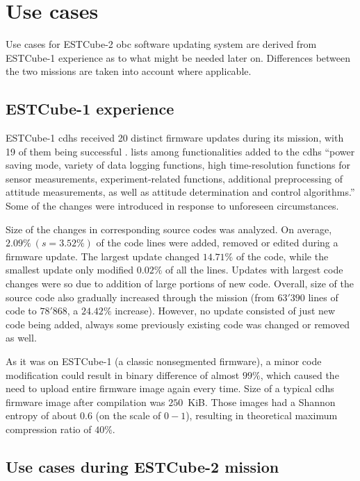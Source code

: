 \newpage
\section{Use cases}
\label{s:usecases}

Use cases for ESTCube-2 \gls{obc} software updating system are derived from ESTCube-1 experience as to what might be needed later on. Differences between the two missions are taken into account where applicable.

\subsection{ESTCube-1 experience}

ESTCube-1 \gls{cdhs} received 20 distinct firmware updates during its mission, with 19 of them being successful \cite{Suenter2016}. \textcite{Slavinskis2015} lists among functionalities added to the \gls{cdhs} ``power saving mode, variety of data logging functions, high time-resolution functions for sensor measurements, experiment-related functions, additional preprocessing of attitude measurements, as well as attitude determination and control algorithms.'' Some of the changes were introduced in response to unforeseen circumstances.

Size of the changes in corresponding source codes was analyzed. On average, $2.09\%\ (s=3.52\%)$ of the code lines were added, removed or edited during a firmware update. The largest update changed $14.71\%$ of the code, while the smallest update only modified $0.02\%$ of all the lines. Updates with largest code changes were so due to addition of large portions of new code. Overall, size of the source code also gradually increased through the mission (from $63'390$ lines of code to $78'868$, a $24.42\%$ increase). However, no update consisted of just new code being added, always some previously existing code was changed or removed as well.

As it was on ESTCube-1 (a classic nonsegmented firmware), a minor code modification could result in binary difference of almost $99\%$, which caused the need to upload entire firmware image again every time. Size of a typical \gls{cdhs} firmware image after compilation was $250$~KiB. Those images had a Shannon entropy of about $0.6$ (on the scale of $0-1$), resulting in theoretical maximum compression ratio of $40\%$. \cite{Suenter2016}

\subsection{Use cases during ESTCube-2 mission}


